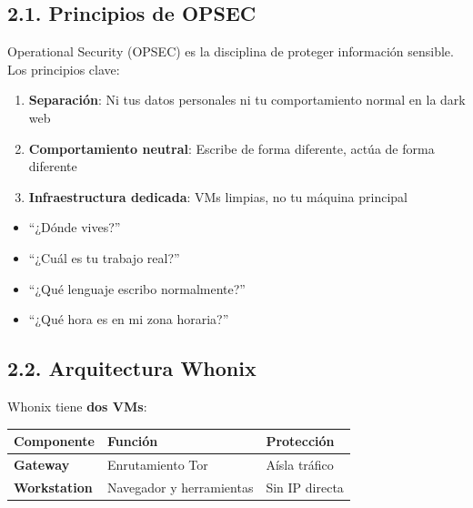 \documentclass[
  letterpaper,
]{report}
\newcounter{none} %
\providecommand{\tightlist}{%
  \setlength{\itemsep}{0pt}\setlength{\parskip}{0pt}}
\begin{document}
\subsection{2.1. Principios de OPSEC}\label{principios-de-opsec}

Operational Security (OPSEC) es la disciplina de proteger información
sensible. Los principios clave:

\begin{enumerate}
\def\labelenumi{\arabic{enumi}.}
\tightlist
\item
  \textbf{Separación}: Ni tus datos personales ni tu comportamiento
  normal en la dark web
\item
  \textbf{Comportamiento neutral}: Escribe de forma diferente, actúa de
  forma diferente
\item
  \textbf{Infraestructura dedicada}: VMs limpias, no tu máquina
  principal
\end{enumerate}

\begin{tcolorbox}[enhanced jigsaw, arc=.35mm, bottomrule=.15mm, bottomtitle=1mm, breakable, colback=white, colbacktitle=quarto-callout-warning-color!10!white, colframe=quarto-callout-warning-color-frame, coltitle=black, left=2mm, leftrule=.75mm, opacityback=0, opacitybacktitle=0.6, rightrule=.15mm, title=\textcolor{quarto-callout-warning-color}{\faExclamationTriangle}\hspace{0.5em}{⚠️ Preguntas que nunca debes responder en dark web}, titlerule=0mm, toprule=.15mm, toptitle=1mm]

\begin{itemize}
\tightlist
\item
  ``¿Dónde vives?''
\item
  ``¿Cuál es tu trabajo real?''
\item
  ``¿Qué lenguaje escribo normalmente?''
\item
  ``¿Qué hora es en mi zona horaria?''
\end{itemize}

\end{tcolorbox}

\subsection{2.2. Arquitectura Whonix}\label{arquitectura-whonix}

Whonix tiene \textbf{dos VMs}:

{\def\LTcaptype{none} %
\begin{longtable}[]{@{}lll@{}}
\toprule\noalign{}
Componente & Función & Protección \\
\midrule\noalign{}
\endhead
\bottomrule\noalign{}
\endlastfoot
\textbf{Gateway} & Enrutamiento Tor & Aísla tráfico \\
\textbf{Workstation} & Navegador y herramientas & Sin IP directa \\
\end{longtable}
}
\end{document}
